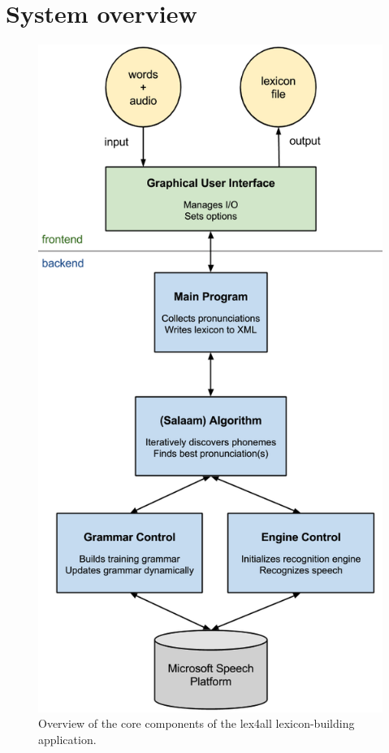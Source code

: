 \documentclass[11pt]{article}
\begin{document}
\section{System overview}
\label{sec:overview}


\begin{figure}[t]
\begin{center}
\includegraphics[width=\columnwidth]{../img/SystemOverview.png}
\caption{Overview of the core components of the lex4all lexicon-building application.\label{fig:system}}
\end{center}
\end{figure}
\end{document}
